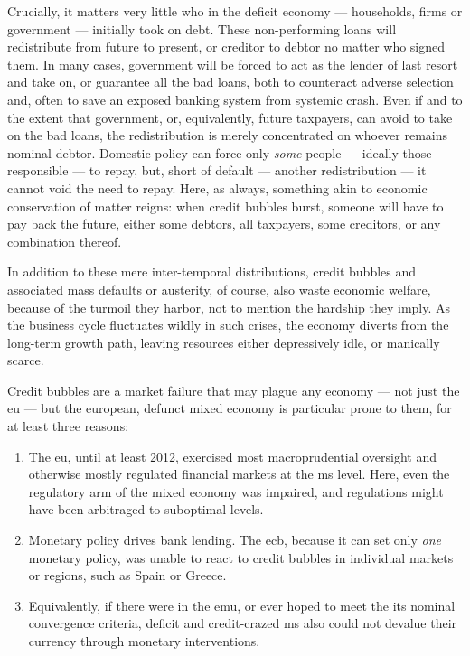 \begin{description}
\begin{enumerate}
		Crucially, it matters very little who in the deficit economy --- households, firms or government --- initially took on debt.
		These non-performing loans will redistribute from future to present, or creditor to debtor no matter who signed them.
		In many cases, government will be forced to act as the lender of last resort and take on, or guarantee all the bad loans, both to counteract adverse selection and, often to save an exposed banking system from systemic crash.
		Even if and to the extent that government, or, equivalently, future taxpayers, can avoid to take on the bad loans, the redistribution is merely concentrated on whoever remains nominal debtor.
		Domestic policy can force only \emph{some} people --- ideally those responsible --- to repay, but, short of default --- another redistribution --- it cannot void the need to repay.
		Here, as always, something akin to economic conservation of matter reigns:
		when credit bubbles burst, someone will have to pay back the future, either some debtors, all taxpayers, some creditors, or any combination thereof.

		In addition to these mere inter-temporal distributions, credit bubbles and associated mass defaults or austerity, of course, also waste economic welfare, because of the turmoil they harbor, not to mention the hardship they imply.
		As the business cycle fluctuates wildly in such crises, the economy diverts from the long-term growth path, leaving resources either depressively idle, or manically scarce.

		Credit bubbles are a market failure that may plague any economy --- not just the \gls{eu} --- but the european, defunct mixed economy is particular prone to them, for at least three reasons:

		\begin{enumerate}
			\item The \gls{eu}, until at least 2012, exercised most macroprudential oversight and otherwise mostly regulated financial markets at the \gls{ms} level.
			Here, even the regulatory arm of the mixed economy was impaired, and regulations might have been arbitraged to suboptimal levels.

			\item Monetary policy drives bank lending.
			The \gls{ecb}, because it can set only \emph{one} monetary policy, was unable to react to credit bubbles in individual markets or regions, such as Spain or Greece.

			\item Equivalently, if there were in the \gls{emu}, or ever hoped to meet the its nominal convergence criteria, deficit and credit-crazed \gls{ms} also could not devalue their currency through monetary interventions.
		\end{enumerate}
	\end{enumerate}


\end{description}
